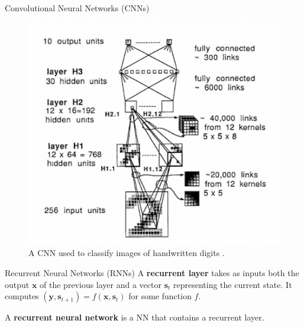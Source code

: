 \documentclass{beamer}
\begin{document}
\begin{frame}{Convolutional Neural Networks (CNNs)}
    \begin{figure}
        \centering
        \includegraphics[scale=0.8]{cnn}
        \caption{A CNN used to classify images of handwritten digits \cite{pml2Book}.}
        \label{fig:cnn}
    \end{figure}
\end{frame}

\begin{frame}{Recurrent Neural Networks (RNNs)}
    A \textbf{recurrent layer} takes as inputs both the output $\boldsymbol{x}$ of the previous layer and a vector $\boldsymbol{s}_t$ representing the current state. It computes $(\boldsymbol{y}, \boldsymbol{s}_{t + 1}) = f(\boldsymbol{x}, \boldsymbol{s}_t)$ for some function $f$.
    
    \medskip
    
    A \textbf{recurrent neural network} is a NN that contains a recurrent layer.
\end{frame}
\end{document}
